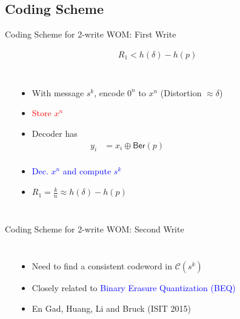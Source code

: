 \documentclass[10pt]{beamer}
\def\WOM_path{../compound-codes/WOM/slides/Figures}
\begin{document}
\subsection{Coding Scheme}
\begin{frame}{Coding Scheme for 2-write WOM: First Write}
  \vspace{-2cm}
  \begin{center}
    \begin{align*}
      R_1 < h(\delta) - h(p)
    \end{align*}
  \end{center}
  \vspace{-0.5cm}
  \begin{columns}
    \begin{center}
      \scalebox{0.5}{}
    \end{center}

    \begin{itemize}
    \item<1-> With message $s^k$, encode $0^n$ to $x^n$ (Distortion $\approx \delta$)
    \item<1-> \textcolor{red}{Store $x^n$}
    \item<2-> Decoder has
      \small{
        \begin{align*}
          y_i&=x_i \oplus \mathsf{Ber}(p) \\
        \end{align*}
      }
    \vspace{-1.25cm}
    \item <3-> \textcolor{blue}{Dec. $x^n$ and compute $s^k$}
    \item <3-> $R_1=\tfrac{k}{n}\approx h(\delta)-h(p)$
    \end{itemize}
  \end{columns}
\end{frame}

\begin{frame}{Coding Scheme for 2-write WOM: Second Write}
  \begin{center}
    \scalebox{0.5}{}    
  \end{center}
  \begin{columns}
    \begin{center}
      \scalebox{0.55}{}
    \end{center}
    \begin{itemize}
    \item Need to find a \alert{consistent} codeword in $\mathcal{C}(s^k)$
    \item<2-> Closely related to \textcolor{blue}{Binary Erasure Quantization (BEQ)}
    \item<2-> En Gad, Huang, Li and Bruck (ISIT 2015)
    \end{itemize}
  \end{columns}
\end{frame}
\end{document}
